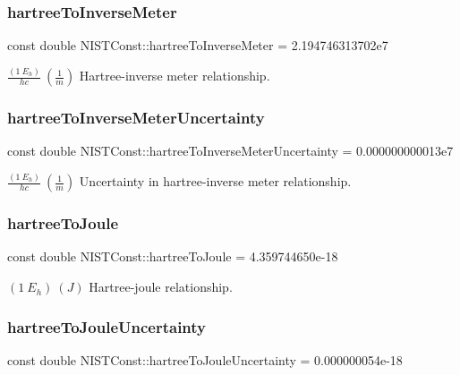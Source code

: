 \subsubsection{\texorpdfstring{hartree\+To\+Inverse\+Meter}{hartreeToInverseMeter}}
{\footnotesize\ttfamily const double N\+I\+S\+T\+Const\+::hartree\+To\+Inverse\+Meter = 2.\+194746313702e7}

$\frac{(1\ E_h)}{hc} \ (\frac{1}{m})$ Hartree-\/inverse meter relationship. \mbox{\label{group___hartree_ga0554c0859210dac9ff459c44c1bd70ca}} 
\subsubsection{\texorpdfstring{hartree\+To\+Inverse\+Meter\+Uncertainty}{hartreeToInverseMeterUncertainty}}
{\footnotesize\ttfamily const double N\+I\+S\+T\+Const\+::hartree\+To\+Inverse\+Meter\+Uncertainty = 0.\+000000000013e7}

$\frac{(1\ E_h)}{hc} \ (\frac{1}{m})$ Uncertainty in hartree-\/inverse meter relationship. \mbox{\label{group___hartree_ga0c47e6885cdf30ceb56ac3c9420cb81c}} 
\subsubsection{\texorpdfstring{hartree\+To\+Joule}{hartreeToJoule}}
{\footnotesize\ttfamily const double N\+I\+S\+T\+Const\+::hartree\+To\+Joule = 4.\+359744650e-\/18}

$(1\ E_h) \ (J)$ Hartree-\/joule relationship. \mbox{\label{group___hartree_ga2e016fc3c1dbb3e68befcfb929034c85}} 
\subsubsection{\texorpdfstring{hartree\+To\+Joule\+Uncertainty}{hartreeToJouleUncertainty}}
{\footnotesize\ttfamily const double N\+I\+S\+T\+Const\+::hartree\+To\+Joule\+Uncertainty = 0.\+000000054e-\/18}

